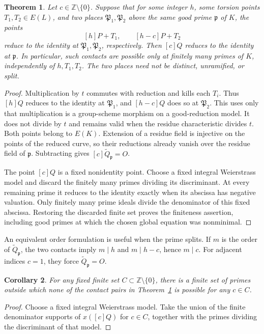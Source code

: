 \documentclass[11pt,a4paper]{article}
\newtheorem{theorem}{Theorem}[section]
\newtheorem{corollary}[theorem]{Corollary}
\newcommand{\Z}{\mathbb Z}\newcommand{\Q}{\mathbb Q}
\begin{document}
\begin{theorem}\label{thm:reduction}
Let $c\in\Z\setminus\{0\}$. Suppose that for some integer $h$,
some torsion points $T_1,T_2\in E(L)$, and two places
$\mathfrak P_1,\mathfrak P_2$ above the same good prime
$\mathfrak p$ of $K$, the points
\[
 [h]P+T_1,\qquad [h-c]P+T_2
\]
reduce to the identity at $\mathfrak P_1,\mathfrak P_2$,
respectively. Then $[c]Q$ reduces to the identity at
$\mathfrak p$.
In particular, such contacts are possible only at finitely many
primes of $K$, independently of $h,T_1,T_2$.
The two places need not be distinct, unramified, or split.
\end{theorem}
\begin{proof}
Multiplication by $t$ commutes with reduction and kills each
$T_i$. Thus $[h]Q$ reduces to the identity at
$\mathfrak P_1$, and $[h-c]Q$ does so at $\mathfrak P_2$.
This uses only that multiplication is a group-scheme morphism
on a good-reduction model. It does not divide by $t$ and
remains valid when the residue characteristic divides $t$.
Both points belong to $E(K)$. Extension of a residue field is
injective on the points of the reduced curve, so their
reductions already vanish over the residue field of
$\mathfrak p$. Subtracting gives
$[c]\widetilde Q_{\mathfrak p}=O$.

The point $[c]Q$ is a fixed nonidentity point. Choose a fixed
integral Weierstrass model and discard the finitely many primes
dividing its discriminant. At every remaining prime it reduces
to the identity exactly when its abscissa has negative valuation.
Only finitely many prime ideals divide the denominator of this
fixed abscissa. Restoring the discarded finite set proves the
finiteness assertion, including good primes at which the chosen
global equation was nonminimal.
\end{proof}

An equivalent order formulation is useful when the prime splits.
If $m$ is the order of $\widetilde Q_{\mathfrak p}$, the two
contacts imply $m\mid h$ and $m\mid h-c$, hence $m\mid c$.
For adjacent indices $c=1$, they force
$\widetilde Q_{\mathfrak p}=O$.

\begin{corollary}\label{cor:menu}
For any fixed finite set $C\subset\Z\setminus\{0\}$, there is
a finite set of primes outside which none of the contact pairs
in Theorem~\ref{thm:reduction} is possible for any $c\in C$.
\end{corollary}
\begin{proof}
Choose a fixed integral Weierstrass model. Take the union of
the finite denominator supports of $x([c]Q)$ for $c\in C$,
together with the primes dividing the discriminant of that model.
\end{proof}
\end{document}
